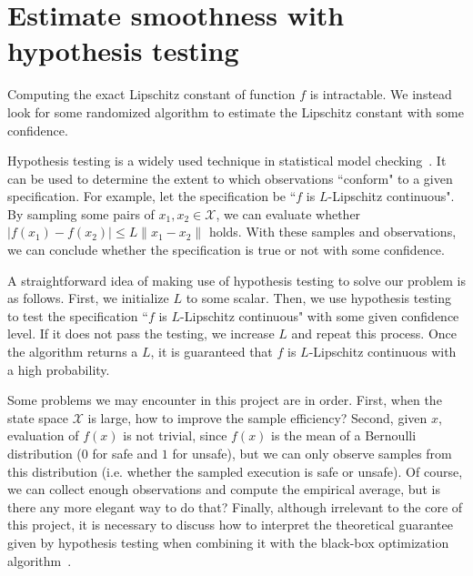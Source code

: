 \documentclass[11pt]{report}
\newcommand{\sayan}[1]{\textcolor{blue}{#1}}
\newcommand{\M}{\mathcal{M}}
\newcommand{\X}{\mathcal{X}}
\newcommand{\modelname}{NiMC\xspace}
\begin{document}


\section*{Estimate smoothness with hypothesis testing}
Computing the exact Lipschitz constant of function $f$ is intractable. We instead look for some randomized algorithm to estimate the Lipschitz constant with some confidence.

Hypothesis testing is a widely used technique in statistical model checking~\cite{agha2018survey}. It can be used to determine the extent to which observations ``conform" to a given specification. For example, let the specification be ``$f$ is $L$-Lipschitz continuous". By sampling some pairs of $x_1, x_2 \in \X$, we can evaluate whether $|f(x_1) - f(x_2)| \leq L \|x_1 - x_2\|$ holds. With these samples and observations, we can conclude whether the specification is true or not with some confidence.

A straightforward idea of making use of hypothesis testing to solve our problem is as follows. First, we initialize $L$ to some scalar. Then, we use hypothesis testing to test the specification ``$f$ is $L$-Lipschitz continuous" with some given confidence level. If it does not pass the testing, we increase $L$ and repeat this process. Once the algorithm returns a $L$, it is guaranteed that $f$ is $L$-Lipschitz continuous with a high probability.

Some problems we may encounter in this project are in order. First, when the state space $\X$ is large, how to improve the sample efficiency? Second, given $x$, evaluation of $f(x)$ is not trivial, since $f(x)$ is the mean of a Bernoulli distribution ($0$ for safe and $1$ for unsafe), but we can only observe samples from this distribution (i.e. whether the sampled execution is safe or unsafe). Of course, we can collect enough observations and compute the empirical average, but is there any more elegant way to do that? Finally, although irrelevant to the core of this project, it is necessary to discuss how to interpret the theoretical guarantee given by hypothesis testing when combining it with the black-box optimization algorithm~\cite{bubeck2009online}.





\end{document}

